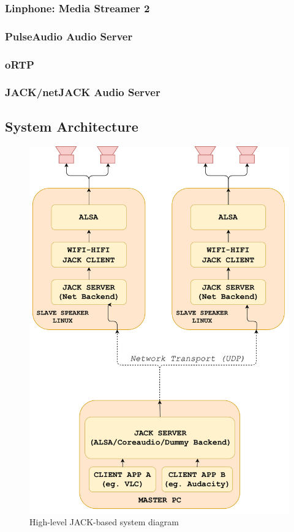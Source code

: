 \documentclass[main.tex]{subfiles}
\begin{document}
\subsubsection{Linphone: Media Streamer 2}

\subsubsection{PulseAudio Audio Server}

\subsubsection{oRTP}

\subsubsection{JACK/netJACK Audio Server}

\subsection{System Architecture}
\begin{figure}[H]
    \centering
    \includegraphics[scale=0.4]{./figs/JACKclients.pdf}
    
    \caption{High-level JACK-based system diagram}
    \label{fig:JACKclients}
\end{figure}
\end{document}
